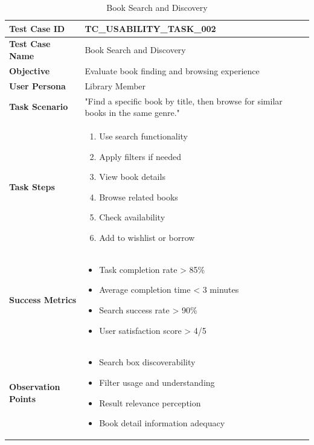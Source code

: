 \documentclass[12pt,a4paper]{article}
\begin{document}
\begin{longtable}{|p{3cm}|p{12cm}|}
\caption{Book Search and Discovery} \\
\hline
\rowcolor{lightgray}
\textbf{Test Case ID} & \textbf{TC\_USABILITY\_TASK\_002} \\
\hline
\textbf{Test Case Name} & Book Search and Discovery \\
\hline
\textbf{Objective} & Evaluate book finding and browsing experience \\
\hline
\textbf{User Persona} & Library Member \\
\hline
\textbf{Task Scenario} & 
"Find a specific book by title, then browse for similar books in the same genre." \\
\hline
\textbf{Task Steps} & 
\begin{enumerate}[nosep]
    \item Use search functionality
    \item Apply filters if needed
    \item View book details
    \item Browse related books
    \item Check availability
    \item Add to wishlist or borrow
\end{enumerate} \\
\hline
\textbf{Success Metrics} & 
\begin{itemize}[nosep]
    \item Task completion rate > 85\%
    \item Average completion time < 3 minutes
    \item Search success rate > 90\%
    \item User satisfaction score > 4/5
\end{itemize} \\
\hline
\textbf{Observation Points} & 
\begin{itemize}[nosep]
    \item Search box discoverability
    \item Filter usage and understanding
    \item Result relevance perception
    \item Book detail information adequacy
\end{itemize} \\
\hline
\end{longtable}
\end{document}
